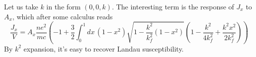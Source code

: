 \documentclass{article}
\begin{document}
Let us take $k$ in the form $(0,0,k)$.  The interesting term is the response of $J_x$ to 
$A_x$, which after some calculus reads
\begin{equation}
   \frac{J_x}{V} = A_x \frac{ne^2}{mc}\left(-1 + \frac{3}{2} \int_0^1 
        dx\,(1-x^2)\sqrt{1 - \frac{k^2}{k_f^2}(1-x^2)} 
            \left(1 - \frac{k^2}{4k_f^2} + \frac{k^2x^2}{2k_f^2}\right)\right)
\end{equation}
By $k^2$ expansion, it's easy to recover Landau susceptibility.
\end{document}
